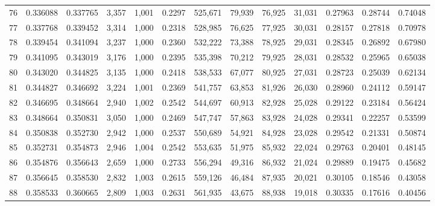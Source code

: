 \begin{tabular}{rrrrrrrrrrrrr}
76  &  0.336088 &  0.337765 &   3,357 &  1,001 &                                     0.2297 &  525,671 &   79,939 &   76,925 &   31,031 &  0.27963 &  0.28744 &  0.74048 \\
77  &  0.337768 &  0.339452 &   3,314 &  1,000 &                                     0.2318 &  528,985 &   76,625 &   77,925 &   30,031 &  0.28157 &  0.27818 &  0.70978 \\
78  &  0.339454 &  0.341094 &   3,237 &  1,000 &                                     0.2360 &  532,222 &   73,388 &   78,925 &   29,031 &  0.28345 &  0.26892 &  0.67980 \\
79  &  0.341095 &  0.343019 &   3,176 &  1,000 &                                     0.2395 &  535,398 &   70,212 &   79,925 &   28,031 &  0.28532 &  0.25965 &  0.65038 \\
80  &  0.343020 &  0.344825 &   3,135 &  1,000 &                                     0.2418 &  538,533 &   67,077 &   80,925 &   27,031 &  0.28723 &  0.25039 &  0.62134 \\
81  &  0.344827 &  0.346692 &   3,224 &  1,001 &                                     0.2369 &  541,757 &   63,853 &   81,926 &   26,030 &  0.28960 &  0.24112 &  0.59147 \\
82  &  0.346695 &  0.348664 &   2,940 &  1,002 &                                     0.2542 &  544,697 &   60,913 &   82,928 &   25,028 &  0.29122 &  0.23184 &  0.56424 \\
83  &  0.348664 &  0.350831 &   3,050 &  1,000 &                                     0.2469 &  547,747 &   57,863 &   83,928 &   24,028 &  0.29341 &  0.22257 &  0.53599 \\
84  &  0.350838 &  0.352730 &   2,942 &  1,000 &                                     0.2537 &  550,689 &   54,921 &   84,928 &   23,028 &  0.29542 &  0.21331 &  0.50874 \\
85  &  0.352731 &  0.354873 &   2,946 &  1,004 &                                     0.2542 &  553,635 &   51,975 &   85,932 &   22,024 &  0.29763 &  0.20401 &  0.48145 \\
86  &  0.354876 &  0.356643 &   2,659 &  1,000 &                                     0.2733 &  556,294 &   49,316 &   86,932 &   21,024 &  0.29889 &  0.19475 &  0.45682 \\
87  &  0.356645 &  0.358530 &   2,832 &  1,003 &                                     0.2615 &  559,126 &   46,484 &   87,935 &   20,021 &  0.30105 &  0.18546 &  0.43058 \\
88  &  0.358533 &  0.360665 &   2,809 &  1,003 &                                     0.2631 &  561,935 &   43,675 &   88,938 &   19,018 &  0.30335 &  0.17616 &  0.40456 \\

\end{tabular}
